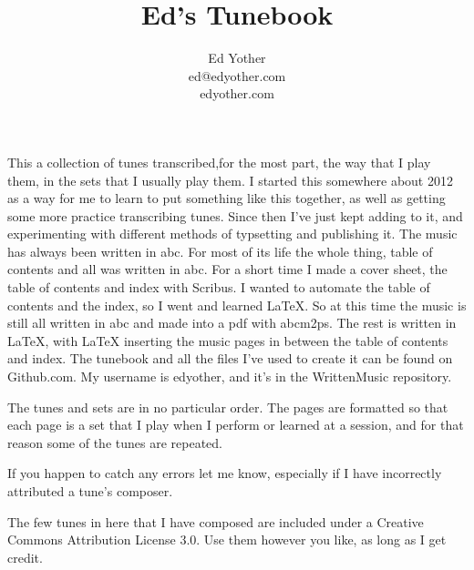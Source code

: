 \documentclass[11pt,letterpaper]{article}
\begin{document}

\title{Ed's Tunebook}
\author{Ed Yother\\ed@edyother.com\\edyother.com}
\maketitle

This a collection of tunes transcribed,for the most part, the way that I play them, in the sets that I usually play them. I started this somewhere about 2012 as a way for me to learn to put something like this together, as well as getting some more practice transcribing tunes. Since then I've just kept adding to it, and experimenting with different methods of typsetting and publishing it. The music has always been written in abc. For most of its life the whole thing, table of contents and all was written in abc. For a short time I made a cover sheet, the table of contents and index with Scribus. I wanted to automate the table of contents and the index, so I went and learned LaTeX. So at this time the music is still all written in abc and made into a pdf with abcm2ps. The rest is written in LaTeX, with LaTeX inserting the music pages in between the table of contents and index. The tunebook and all the files I've used to create it can be found on Github.com. My username is edyother, and it's in the WrittenMusic repository. 

The tunes and sets are in no particular order. The pages are formatted so that each page is a set that I play when I perform or learned at a session, and for that reason some of the tunes are repeated.

If you happen to catch any errors let me know, especially if I have incorrectly attributed a tune's composer.

The few tunes in here that I have composed are included under a Creative Commons Attribution License 3.0. Use them however you like, as long as I get credit.

\pagebreak
\tableofcontents

\newpage



\setcounter{page}{1}

\end{document}
